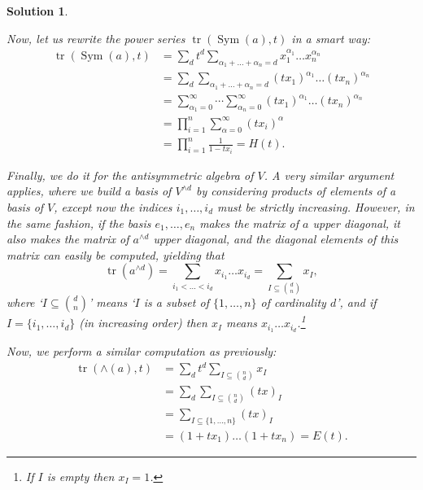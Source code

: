 \documentclass{article}
\theoremstyle{nonumberplain}
\newtheorem{sol}{Solution}
\DeclareMathOperator{\trace}{tr}
\DeclareMathOperator{\Sym}{Sym}
\begin{document}
\begin{sol}
\begin{enumerate}
Now, let us rewrite the power series $\trace(\Sym(a), t)$ in a smart way:
\begin{equation}
\begin{aligned}
\trace(\Sym(a), t) &= \sum_d t^d \sum_{\alpha_1 + \dots + \alpha_n = d} x_1^{\alpha_1} \dots x_n^{\alpha_n}\\
&= \sum_d \sum_{\alpha_1 + \dots + \alpha_n = d} (t x_1)^{\alpha_1} \dots (t x_n)^{\alpha_n}\\
&=\sum_{\alpha_1 = 0}^\infty \cdots \sum_{\alpha_n=0}^\infty (t x_1)^{\alpha_1} \dots (t x_n)^{\alpha_n}\\
&= \prod_{i = 1}^n \sum_{\alpha = 0}^\infty (t x_i)^\alpha\\
&= \prod_{i=1}^n \frac1{1 - t x_i} = H(t).
\end{aligned}
\end{equation}

\smallskip

Finally, we do it for the antisymmetric algebra of $V$. A very similar argument applies, where we build a basis of $V^{\wedge d}$ by considering products of elements of a basis of $V$, except now the indices $i_1, \dots, i_d$ must be \emph{strictly} increasing. However, in the same fashion, if the basis $e_1, \dots, e_n$ makes the matrix of $a$ upper diagonal, it also makes the matrix of $a^{\wedge d}$ upper diagonal, and the diagonal elements of this matrix can easily be computed, yielding that
\begin{equation}
\trace(a^{\wedge d}) = \sum_{i_1 < \dots < i_d} x_{i_1} \dots x_{i_d} = \sum_{I \subseteq \binom d n} x_I,
\end{equation}
where `$I \subseteq \binom d n$' means `$I$ is a subset of $\{1, \dots, n\}$ of cardinality $d$', and if $I = \{i_1, \dots, i_d\}$ (in increasing order) then $x_I$ means $x_{i_1} \dots x_{i_d}$.\footnote{If $I$ is empty then $x_I = 1$.}

Now, we perform a similar computation as previously:
\begin{equation}
\begin{aligned}
\trace(\wedge(a), t) &= \sum_d t^d \sum_{I \subseteq \binom n d} x_I\\
&= \sum_d \sum_{I \subseteq \binom n d} (t x)_I\\
&= \sum_{I \subseteq \{1,\dots,n\}} (t x)_I\\
&= (1 + t x_1) \dots (1 + t x_n) = E(t).
\end{aligned}
\end{equation}


\end{enumerate}
\end{sol}
\end{document}
